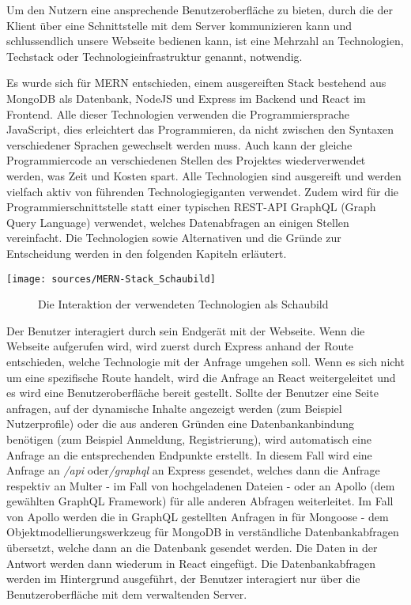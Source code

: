 Um den Nutzern eine ansprechende Benutzeroberfläche zu bieten, durch die der Klient über eine Schnittstelle mit dem Server kommunizieren kann und schlussendlich unsere Webseite bedienen kann, ist eine Mehrzahl an Technologien, Techstack oder Technologieinfrastruktur genannt, notwendig.

Es wurde sich für MERN entschieden, einem ausgereiften Stack bestehend aus MongoDB als Datenbank, NodeJS und Express im Backend und React im Frontend. Alle dieser Technologien verwenden die Programmiersprache JavaScript, dies erleichtert das Programmieren, da nicht zwischen den Syntaxen verschiedener Sprachen gewechselt werden muss. Auch kann der gleiche Programmiercode an verschiedenen Stellen des Projektes wiederverwendet werden, was Zeit und Kosten spart. Alle Technologien sind ausgereift und werden vielfach aktiv von führenden Technologiegiganten verwendet. Zudem wird für die Programmierschnittstelle statt einer typischen REST-API GraphQL (Graph Query Language) verwendet, welches Datenabfragen an einigen Stellen vereinfacht. Die Technologien sowie Alternativen und die Gründe zur Entscheidung werden in den folgenden Kapiteln erläutert.

\texttt{[image: sources/MERN-Stack\_Schaubild]}
\begin{figure}[ht]
	\centering
	\caption{Die Interaktion der verwendeten Technologien als Schaubild}
	\label{figMERN1}
\end{figure}

Der Benutzer interagiert durch sein Endgerät mit der Webseite. Wenn die Webseite aufgerufen wird, wird zuerst durch Express anhand der Route entschieden, welche Technologie mit der Anfrage umgehen soll. Wenn es sich nicht um eine spezifische Route handelt, wird die Anfrage an React weitergeleitet und es wird eine Benutzeroberfläche bereit gestellt. Sollte der Benutzer eine Seite anfragen, auf der dynamische Inhalte angezeigt werden (zum Beispiel Nutzerprofile) oder die aus anderen Gründen eine Datenbankanbindung benötigen (zum Beispiel Anmeldung, Registrierung), wird automatisch eine Anfrage an die entsprechenden Endpunkte erstellt. In diesem Fall wird eine Anfrage an \textit{/api} oder\textit{/graphql} an Express gesendet, welches dann die Anfrage respektiv an Multer - im Fall von hochgeladenen Dateien - oder an Apollo (dem gewählten GraphQL Framework) für alle anderen Abfragen weiterleitet. Im Fall von Apollo werden die in GraphQL gestellten Anfragen in für Mongoose - dem Objektmodellierungswerkzeug für MongoDB in verständliche Datenbankabfragen übersetzt, welche dann an die Datenbank gesendet werden. Die Daten in der Antwort werden dann wiederum in React eingefügt. Die Datenbankabfragen werden im Hintergrund ausgeführt, der Benutzer interagiert nur über die Benutzeroberfläche mit dem verwaltenden Server.

